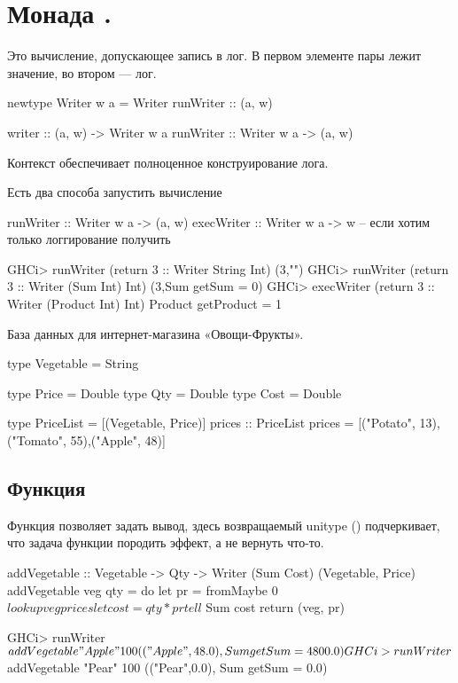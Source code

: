 \documentclass[11pt,a4paper]{article}
\begin{document}
\section{Монада .}
Это вычисление, допускающее запись в лог. В первом элементе пары лежит значение, во втором --- лог.
\begin{hscode}
newtype Writer w a = Writer { runWriter :: (a, w) }

writer :: (a, w) -> Writer w a
runWriter :: Writer w a -> (a, w)
\end{hscode}
Контекст  обеспечивает полноценное конструирование
лога.
Есть два способа запустить вычисление
\begin{hscode}
runWriter :: Writer w a -> (a, w)
execWriter :: Writer w a -> w  -- если хотим только логгирование получить

GHCi> runWriter (return 3 :: Writer String Int)
(3,"")
GHCi> runWriter (return 3 :: Writer (Sum Int) Int)
(3,Sum {getSum = 0})
GHCi> execWriter (return 3 :: Writer (Product Int) Int)
Product {getProduct = 1}
\end{hscode}
База данных для интернет-магазина «Овощи-Фрукты».
\begin{hscode}
type Vegetable = String

type Price = Double
type Qty = Double
type Cost = Double

type PriceList = [(Vegetable, Price)]
prices :: PriceList
prices = [("Potato", 13),("Tomato", 55),("Apple", 48)]
\end{hscode}
\subsection{Функция }
Функция  позволяет задать вывод, здесь возвращаемый unitype () подчеркивает, что задача функции породить эффект, а не вернуть что-то.
\begin{hscode}
addVegetable :: Vegetable -> Qty -> Writer (Sum Cost) (Vegetable, Price)
addVegetable veg qty = do
	let pr = fromMaybe 0 $ lookup veg prices
	let cost = qty * pr
	tell $ Sum cost
	return (veg, pr)

GHCi> runWriter $ addVegetable "Apple" 100
(("Apple",48.0), Sum {getSum = 4800.0})
GHCi> runWriter $ addVegetable "Pear" 100
(("Pear",0.0), Sum {getSum = 0.0})
\end{hscode}
\end{document}
